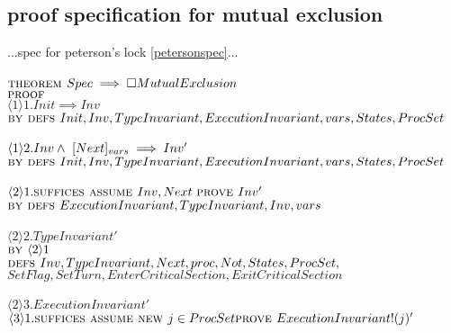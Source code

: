 \documentclass[fleqn]{tukseminar}
\begin{document}
			\subsection*{\tla proof specification for mutual exclusion}
			...\tla spec for peterson's lock \ref{petersonspec}...\\\\
			$\textsc{theorem } Spec \implies \square MutualExclusion$\\
			$\textsc{proof }$\\
			\hspace*{0.8cm}$\langle1\rangle1. Init \implies Inv$\\
			\hspace*{1.2cm} $\textsc{by } \textsc{defs } Init, Inv, TypeInvariant, ExecutionInvariant, vars,States,ProcSet$\\\\
			\hspace*{0.8cm}$\langle1\rangle2. Inv \land \  [Next]_{vars} \implies Inv'$\\
			\hspace*{1.2cm} $\textsc{by } \textsc{defs } Init, Inv, TypeInvariant, ExecutionInvariant, vars,States,ProcSet$\\\\
			\hspace*{1.6cm}$\langle2\rangle1. \textsc{suffices } \textsc{assume } Inv,Next\  \textsc{prove } Inv'$\\
			\hspace*{2cm} $\textsc{by } \textsc{defs } ExecutionInvariant,TypeInvariant,Inv,vars$\\\\
			\hspace*{1.6cm}$\langle2\rangle2. TypeInvariant'$\\
			\hspace*{2cm} $\textsc{by } \langle2\rangle1$\\
			\hspace*{2cm}$ \textsc{defs } Inv, TypeInvariant, Next, proc, Not, States, ProcSet,$\\
			\hspace*{2cm}$ SetFlag, SetTurn, EnterCriticalSection, ExitCriticalSection$\\\\
			\hspace*{1.6cm}$\langle2\rangle3. ExecutionInvariant'$\\
			\hspace*{2.8cm}$\langle3\rangle1. \textsc{suffices } \textsc{assume } \textsc{new } j \in ProcSet \textsc{prove } ExecutionInvariant!(j)'$\\
\end{document}
